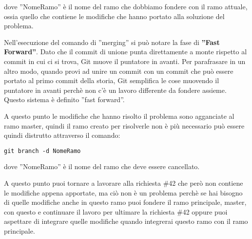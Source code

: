 dove ''NomeRamo'' è il nome del ramo che dobbiamo fondere con il ramo attuale, ossia quello che contiene le modifiche che hanno portato alla soluzione del problema.

Nell'esecuzione del comando di ''merging'' si può notare la fase di \textbf{''Fast Forward''}. Dato che il commit di unione punta direttamente a monte rispetto al commit in cui ci si trova, Git muove il puntatore in avanti. Per parafrasare in un altro modo, quando provi ad unire un commit con un commit che può essere portato al primo commit della storia, Git semplifica le cose muovendo il puntatore in avanti perchè non c'è un lavoro differente da fondere assieme. Questo sistema è definito ''fast forward''.

A questo punto le modifiche che hanno risolto il problema sono agganciate al ramo master, quindi il ramo creato per risolverle non è più necessario può essere quindi distrutto attraverso il comando:

\begin{center}
\texttt{git branch -d NomeRamo}
\end{center}

dove ''NomeRamo'' è il nome del ramo che deve essere cancellato. 

A questo punto puoi tornare a lavorare alla richiesta \#42 che però non contiene le modifiche appena apportate, ma ciò non è un problema perchè se hai bisogno di quelle modifiche anche in questo ramo puoi fondere il ramo principale, master, con questo e continuare il lavoro per ultimare la richiesta \#42 oppure puoi aspettare di integrare quelle modifiche quando integrerai questo ramo con il ramo principale.

